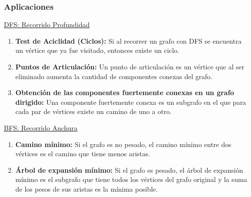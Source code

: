 \documentclass[../main.tex]{subfiles}
\begin{document}
            \subsubsection{Aplicaciones}
                \underline{DFS: Recorrido Profundidad}
                \begin{enumerate}
                    \item \textbf{Test de Aciclidad (Ciclos):} Si al recorrer un grafo con DFS se encuentra un vértice que ya fue visitado, entonces existe un ciclo.
                    \item  \textbf{Puntos de Articulación:} Un punto de articulación es un vértice que al ser eliminado aumenta la cantidad de componentes conexas del grafo.
                    \item \textbf{Obtención de las componentes fuertemente conexas en un grafo dirigido:} Una componente fuertemente conexa es un subgrafo en el que para cada par de vértices existe un camino de uno a otro.
                \end{enumerate}

                \underline{BFS: Recorrido Anchura}
                \begin{enumerate}
                    \item \textbf{Camino mínimo:} Si el grafo es no pesado, el camino mínimo entre dos vértices es el camino que tiene menos aristas.
                    \item \textbf{Árbol de expansión mínimo:} Si el grafo es pesado, el árbol de expansión mínimo es el subgrafo que tiene todos los vértices del grafo original y la suma de los pesos de sus aristas es la mínima posible.
                \end{enumerate}
\end{document}
